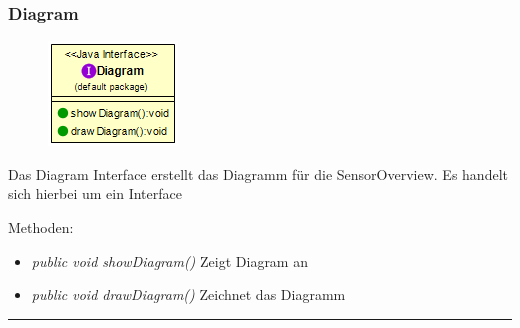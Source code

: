 \subsubsection{Diagram}
\begin{minipage}{0.3\textwidth}
    \begin{figure}[H]
        {\centering\includegraphics[scale = 0.5
        ]{media/view/diagram/Diagram_Class.png}}
    \end{figure}
    \end{minipage} \hfill
    \begin{minipage}{0.6\textwidth}
Das Diagram Interface erstellt das Diagramm für die SensorOverview. Es handelt sich hierbei um ein Interface
\end{minipage}
Methoden: \begin{itemize} [noitemsep]
    \item \emph{public void showDiagram()} Zeigt Diagram an
    \item \emph{public void drawDiagram()} Zeichnet das Diagramm
\end{itemize}

\rule{\textwidth}{0.4pt}
